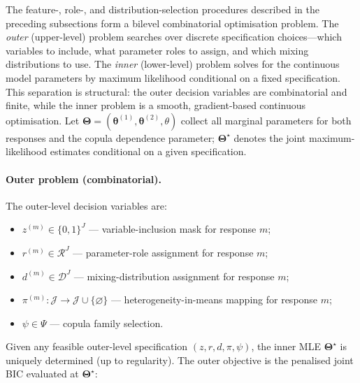 \documentclass[letterpaper,8pt]{extarticle}  %
\begin{document}
\begin{doublespacing}
\begin{linenumbers}
The feature-, role-, and distribution-selection procedures described in the preceding subsections form a bilevel combinatorial optimisation problem. The \emph{outer} (upper-level) problem searches over discrete specification choices---which variables to include, what parameter roles to assign, and which mixing distributions to use. The \emph{inner} (lower-level) problem solves for the continuous model parameters by maximum likelihood conditional on a fixed specification. This separation is structural: the outer decision variables are combinatorial and finite, while the inner problem is a smooth, gradient-based continuous optimisation. Let $\boldsymbol\Theta = (\boldsymbol\theta^{(1)}, \boldsymbol\theta^{(2)}, \theta)$ collect all marginal parameters for both responses and the copula dependence parameter; $\boldsymbol\Theta^\star$ denotes the joint maximum-likelihood estimates conditional on a given specification.

\paragraph{Outer problem (combinatorial).}
The outer-level decision variables are:
\begin{itemize}[nosep]
  \item $z^{(m)} \in \{0,1\}^J$ --- variable-inclusion mask for response $m$;
  \item $r^{(m)} \in \mathcal{R}^J$ --- parameter-role assignment for response $m$;
  \item $d^{(m)} \in \mathcal{D}^J$ --- mixing-distribution assignment for response $m$;
  \item $\pi^{(m)}: \mathcal{J} \to \mathcal{J} \cup \{\varnothing\}$ --- heterogeneity-in-means mapping for response $m$;
  \item $\psi \in \Psi$ --- copula family selection.
\end{itemize}
Given any feasible outer-level specification $(z,r,d,\pi,\psi)$, the inner MLE $\boldsymbol\Theta^\star$ is uniquely determined (up to regularity). The outer objective is the penalised joint BIC evaluated at $\boldsymbol\Theta^\star$:


\end{linenumbers}
\end{doublespacing}
\end{document}
